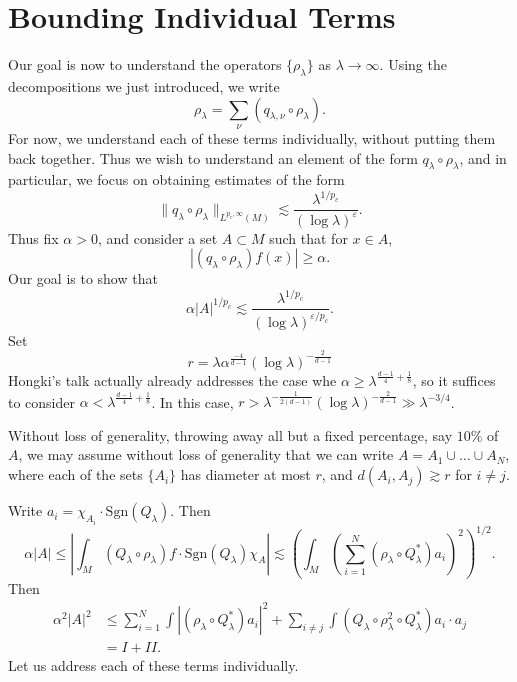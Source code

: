 \documentclass{article}
\theoremstyle{plain}
\theoremstyle{remark}
\theoremstyle{definition}
\begin{document}
\section{Bounding Individual Terms}

Our goal is now to understand the operators $\{ \rho_\lambda \}$ as $\lambda \to \infty$. Using the decompositions we just introduced, we write
%
\[ \rho_\lambda = \sum_\nu (q_{\lambda,\nu} \circ \rho_\lambda). \]
%
For now, we understand each of these terms individually, without putting them back together. Thus we wish to understand an element of the form $q_\lambda \circ \rho_\lambda$, and in particular, we focus on obtaining estimates of the form
%
\[ \| q_\lambda \circ \rho_\lambda \|_{L^{p_c,\infty}(M)} \lesssim \frac{\lambda^{1/p_c}}{(\log \lambda)^\varepsilon}. \]
%
Thus fix $\alpha > 0$, and consider a set $A \subset M$ such that for $x \in A$,
%
\[ |(q_\lambda \circ \rho_\lambda) f (x)| \geq \alpha. \]
%
Our goal is to show that
%
\[ \alpha |A|^{1/p_c} \lesssim \frac{\lambda^{1/p_c}}{(\log \lambda)^{\varepsilon / p_c}}. \]
%
Set
%
\[ r = \lambda \alpha^{\frac{-4}{d-1}} (\log \lambda)^{- \frac{2}{d-1}} \]
%
Hongki's talk actually already addresses the case whe $\alpha \geq \lambda^{\frac{d-1}{4} + \frac{1}{8}}$, so it suffices to consider $\alpha < \lambda^{\frac{d-1}{4} + \frac{1}{8}}$. In this case, $r > \lambda^{-\frac{1}{2(d-1)}} (\log \lambda)^{- \frac{2}{d-1}} \gg \lambda^{-3/4}$.

Without loss of generality, throwing away all but a fixed percentage, say $10\%$ of $A$, we may assume without loss of generality that we can write $A = A_1 \cup \dots \cup A_N$, where each of the sets $\{ A_i \}$ has diameter at most $r$, and $d(A_i,A_j) \gtrsim r$ for $i \neq j$.

Write $a_i = \chi_{A_i} \cdot \text{Sgn}(Q_\lambda)$. Then
%
\[ \alpha |A| \leq \left| \int_M (Q_\lambda \circ \rho_\lambda) f \cdot \text{Sgn}(Q_\lambda) \chi_A \right| \lesssim \left( \int_M \left( \sum_{i = 1}^N (\rho_\lambda \circ Q_\lambda^*) a_i \right)^2 \right)^{1/2}. \]
%
Then
%
\begin{align*}
    \alpha^2 |A|^2 &\leq \sum_{i = 1}^N \int |(\rho_\lambda \circ Q_\lambda^*) a_i |^2 + \sum_{i \neq j} \int \left(  Q_\lambda \circ \rho_\lambda^2 \circ Q_\lambda^* \right) a_i \cdot a_j\\
    &= I + II.
\end{align*}
%
Let us address each of these terms individually.
\end{document}
